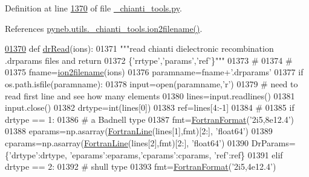 Definition at line \hyperlink{__chianti__tools_8py_source_l01370}{1370} of file \hyperlink{__chianti__tools_8py_source}{\+\_\+chianti\+\_\+tools.\+py}.



References \hyperlink{__chianti__tools_8py_source_l00396}{pyneb.\+utils.\+\_\+chianti\+\_\+tools.\+ion2filename()}.


\begin{DoxyCode}
\hypertarget{namespacepyneb_1_1utils_1_1__chianti__tools_l01370}{}\hyperlink{namespacepyneb_1_1utils_1_1__chianti__tools_aa29da4afe4adccd8de62c0dd97799dcd}{01370} \textcolor{keyword}{def }\hyperlink{namespacepyneb_1_1utils_1_1__chianti__tools_aa29da4afe4adccd8de62c0dd97799dcd}{drRead}(ions):
01371     \textcolor{stringliteral}{"""read chianti dielectronic recombination .drparams files and return}
01372 \textcolor{stringliteral}{        \{'rrtype','params','ref'\}"""}
01373     \textcolor{comment}{#}
01374     \textcolor{comment}{#}
01375     fname=\hyperlink{namespacepyneb_1_1utils_1_1__chianti__tools_ad4bc7b577fd4c3819ceb00b0a444351b}{ion2filename}(ions)
01376     paramname=fname+\textcolor{stringliteral}{'.drparams'}
01377     \textcolor{keywordflow}{if} os.path.isfile(paramname):
01378         input=open(paramname,\textcolor{stringliteral}{'}\textcolor{stringliteral}{r')}
01379 \textcolor{stringliteral}{        }\textcolor{comment}{#  need to read first line and see how many elements}
01380         lines=input.readlines()
01381         input.close()
01382         drtype=int(lines[0])
01383         ref=lines[4:-1]
01384         \textcolor{comment}{#}
01385         \textcolor{keywordflow}{if} drtype == 1:
01386             \textcolor{comment}{# a Badnell type}
01387             fmt=\hyperlink{classpyneb_1_1utils_1_1_fortran_format_1_1_fortran_format}{FortranFormat}(\textcolor{stringliteral}{'2i5,8e12.4'})
01388             eparams=np.asarray(\hyperlink{classpyneb_1_1utils_1_1_fortran_format_1_1_fortran_line}{FortranLine}(lines[1],fmt)[2:], \textcolor{stringliteral}{'float64'})
01389             cparams=np.asarray(\hyperlink{classpyneb_1_1utils_1_1_fortran_format_1_1_fortran_line}{FortranLine}(lines[2],fmt)[2:], \textcolor{stringliteral}{'float64'})
01390             DrParams=\{\textcolor{stringliteral}{'drtype'}:drtype, \textcolor{stringliteral}{'eparams'}:eparams,\textcolor{stringliteral}{'cparams'}:cparams,  \textcolor{stringliteral}{'ref'}:ref\}
01391         \textcolor{keywordflow}{elif} drtype == 2:
01392             \textcolor{comment}{# shull type}
01393             fmt=\hyperlink{classpyneb_1_1utils_1_1_fortran_format_1_1_fortran_format}{FortranFormat}(\textcolor{stringliteral}{'2i5,4e12.4'})

\end{DoxyCode}
